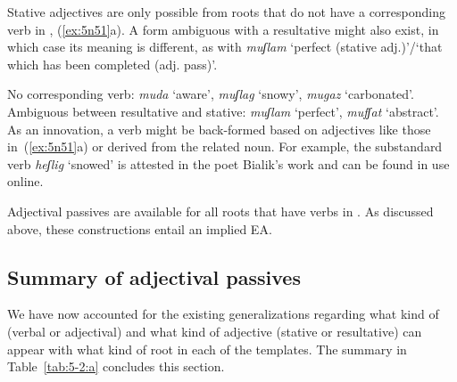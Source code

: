 \begin{exe}
\begin{xlist}
\begin{exe}
\begin{xlist}
\begin{exe}
\begin{exe}
\begin{xlist}
\begin{exe}
\begin{exe}
\begin{xlist}
\begin{exe}
\begin{xlist}
\begin{exe}
\begin{xlist}
\begin{exe}
\begin{xlist}
\begin{exe}
\begin{xlist}
\begin{xlist}
\begin{exe}
\begin{xlist}
\begin{exe}
\begin{xlist}
\begin{exe}
\begin{exe}
\begin{exe}
\begin{xlist}
\begin{exe}
\begin{exe}
\begin{xlist}
\begin{exe}
\begin{xlist}
\begin{exe}
\begin{xlist}
\begin{exe}
\begin{xlist}
\begin{xlist}
\begin{exe}
\begin{xlist}
\begin{exe}
\begin{xlist}
\begin{exe}
\begin{xlist}
\begin{exe}
\begin{xlist}
\begin{exe}
\begin{exe}
\begin{exe}
\begin{exe}
\begin{exe}
\begin{xlist}
\begin{xlist}
\begin{exe}
\begin{xlist}
\begin{exe}
\begin{xlist}
\begin{exe}
\begin{exe}
\begin{exe}
\begin{xlist}
\begin{exe}
\begin{xlist}
Stative adjectives are only possible from roots that do not have a corresponding verb in \thif, (\ref{ex:5n51}a). A form ambiguous with a resultative might also exist, in which case its meaning is different, as with \emph{muʃlam} `perfect (stative adj.)'/`that which has been completed (adj. pass)'.
 \begin{exe}
 \ex  \label{ex:5n51}
 \begin{xlist} 
   \ex  No corresponding verb: \emph{muda} `aware', \emph{muʃlag} `snowy', \emph{mugaz} `carbonated'. 
   \ex  Ambiguous between resultative and stative: \emph{muʃlam} `perfect', \emph{mufʃat} `abstract'. 
 \z
\z 
As an innovation, a verb might be back-formed based on adjectives like those in~(\ref{ex:5n51}a) or derived from the related noun. For example, the substandard verb \emph{heʃlig} `snowed' is attested in the poet Bialik's work and can be found in use online.

Adjectival passives are available for all roots that have verbs in \thif. As discussed above, these constructions entail an implied EA.

	\subsection{Summary of adjectival passives}
We have now accounted for the existing generalizations regarding what kind of  (verbal or adjectival) and what kind of adjective (stative or resultative) can appear with what kind of root in each of the templates. The summary in Table~\ref{tab:5-2:a} concludes this section.


\end{xlist}
\end{exe}
\end{xlist}
\end{exe}
\end{xlist}
\end{exe}
\end{exe}
\end{exe}
\end{xlist}
\end{exe}
\end{xlist}
\end{exe}
\end{xlist}
\end{xlist}
\end{exe}
\end{exe}
\end{exe}
\end{exe}
\end{exe}
\end{xlist}
\end{exe}
\end{xlist}
\end{exe}
\end{xlist}
\end{exe}
\end{xlist}
\end{exe}
\end{xlist}
\end{xlist}
\end{exe}
\end{xlist}
\end{exe}
\end{xlist}
\end{exe}
\end{xlist}
\end{exe}
\end{exe}
\end{xlist}
\end{exe}
\end{exe}
\end{exe}
\end{xlist}
\end{exe}
\end{xlist}
\end{exe}
\end{xlist}
\end{xlist}
\end{exe}
\end{xlist}
\end{exe}
\end{xlist}
\end{exe}
\end{xlist}
\end{exe}
\end{xlist}
\end{exe}
\end{exe}
\end{xlist}
\end{exe}
\end{exe}
\end{xlist}
\end{exe}
\end{xlist}
\end{exe}
